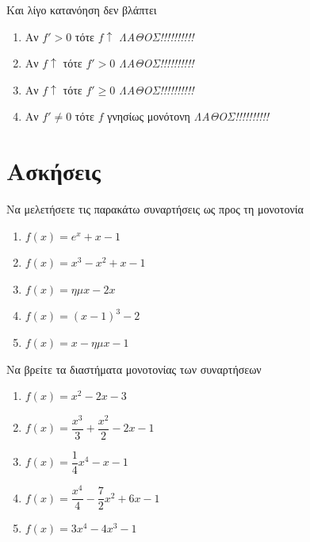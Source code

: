 \documentclass{presentation}
\begin{document}
\begin{frame}{Και λίγο κατανόηση δεν βλάπτει}
    \begin{enumerate}
        \item<1-> Αν $f'>0$ τότε $f\uparrow$  {\emph{ΛΑΘΟΣ!!!!!!!!!!}}
        \item<3-> Αν $f\uparrow$ τότε $f'>0$  {\emph{ΛΑΘΟΣ!!!!!!!!!!}}
        \item<5-> Αν $f\uparrow$ τότε $f'\ge 0$  {\emph{ΛΑΘΟΣ!!!!!!!!!!}}
        \item<7-> Αν $f'\ne 0$ τότε $f$ γνησίως μονότονη  {\emph{ΛΑΘΟΣ!!!!!!!!!!}}
    \end{enumerate}
\end{frame}

\section{Ασκήσεις}
\begin{askisi}
    Να μελετήσετε τις παρακάτω συναρτήσεις ως προς τη μονοτονία
    \begin{enumerate}
        \item<1-> $f(x)=e^x+x-1$
        \item<2-> $f(x)=x^3-x^2+x-1$
        \item<3-> $f(x)=ημx-2x$
        \item<4-> $f(x)=(x-1)^3-2$
        \item<5-> $f(x)=x-ημx-1$
    \end{enumerate}

\end{askisi}

\begin{askisi}
    Να βρείτε τα διαστήματα μονοτονίας των συναρτήσεων
    \begin{enumerate}
        \item<1-> $f(x)=x^2-2x-3$
        \item<2-> $f(x)=\dfrac{x^3}{3}+\dfrac{x^2}{2}-2x-1$
        \item<3-> $f(x)=\dfrac{1}{4}x^4-x-1$
        \item<4-> $f(x)=\dfrac{x^4}{4}-\dfrac{7}{2}x^2+6x-1$
        \item<5-> $f(x)=3x^4-4x^3-1$
    \end{enumerate}

\end{askisi}
\end{document}
